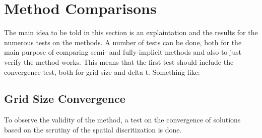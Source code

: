 
%
%     
  
\section{Method Comparisons}

The main idea to be told in this section is an explaintation and the results for the numerous tests on the methods.
A number of tests can be done, both for the main purpose of comparing semi- and fully-implicit methods and also to just verify the method works.
This means that the first test should include the convergence test, both for grid size and delta t.
Something like:
\subsection{Grid Size Convergence}
  To observe the validity of the method, a test on the convergence of solutions based on the scrutiny of the spatial discritization is done.

